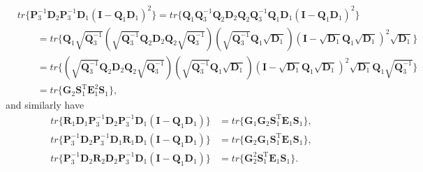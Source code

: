 \documentclass[12pt]{article}
\begin{document}
\begin{align}  \label{eq:dif4_F2_b}
& tr\{ \mathbf{P}_3^{-1} \mathbf{D}_2 \mathbf{P}_3^{-1} \mathbf{D}_1 (\mathbf{I} - \mathbf{Q}_1 \mathbf{D}_1)^2 \} = tr\{ \mathbf{Q}_1 \mathbf{Q}_3^{-1} \mathbf{Q}_2 \mathbf{D}_2 \mathbf{Q}_2 \mathbf{Q}_3^{-1} \mathbf{Q}_1 \mathbf{D}_1 (\mathbf{I} - \mathbf{Q}_1 \mathbf{D}_1)^2 \}  \nonumber \\
& \qquad = tr\{ \mathbf{Q}_1 \sqrt{\mathbf{Q}_3^{-1}} (\sqrt{\mathbf{Q}_3^{-1}} \mathbf{Q}_2 \mathbf{D}_2 \mathbf{Q}_2 \sqrt{\mathbf{Q}_3^{-1}}) (\sqrt{\mathbf{Q}_3^{-1}} \mathbf{Q}_1 \sqrt{\mathbf{D}_1}) (\mathbf{I} - \sqrt{\mathbf{D}_1} \mathbf{Q}_1 \sqrt{\mathbf{D}_1})^2 \sqrt{\mathbf{D}_1} \}  \nonumber \\
& \qquad = tr\{ (\sqrt{\mathbf{Q}_3^{-1}} \mathbf{Q}_2 \mathbf{D}_2 \mathbf{Q}_2 \sqrt{\mathbf{Q}_3^{-1}}) (\sqrt{\mathbf{Q}_3^{-1}} \mathbf{Q}_1 \sqrt{\mathbf{D}_1}) (\mathbf{I} - \sqrt{\mathbf{D}_1} \mathbf{Q}_1 \sqrt{\mathbf{D}_1})^2 \sqrt{\mathbf{D}_1} \mathbf{Q}_1 \sqrt{\mathbf{Q}_3^{-1}} \}  \nonumber \\
& \qquad = tr\{ \mathbf{G}_2 \mathbf{S}_1^{\mathrm{T}} \mathbf{E}_1^2 \mathbf{S}_1 \},
\end{align}
and similarly have
\begin{subequations} \label{eq:dif4_F2_c}
\begin{align}
tr\{ \mathbf{R}_1 \mathbf{D}_1 \mathbf{P}_3^{-1} \mathbf{D}_2 \mathbf{P}_3^{-1} \mathbf{D}_1 (\mathbf{I} - \mathbf{Q}_1 \mathbf{D}_1) \} &= tr\{ \mathbf{G}_1 \mathbf{G}_2 \mathbf{S}_1^{\mathrm{T}} \mathbf{E}_1 \mathbf{S}_1 \},\\
tr\{ \mathbf{P}_3^{-1} \mathbf{D}_2 \mathbf{P}_3^{-1} \mathbf{D}_1 \mathbf{R}_1 \mathbf{D}_1 (\mathbf{I} - \mathbf{Q}_1 \mathbf{D}_1) \} &= tr\{ \mathbf{G}_2 \mathbf{G}_1 \mathbf{S}_1^{\mathrm{T}} \mathbf{E}_1 \mathbf{S}_1 \},\\
tr\{ \mathbf{P}_3^{-1} \mathbf{D}_2 \mathbf{R}_2 \mathbf{D}_2 \mathbf{P}_3^{-1} \mathbf{D}_1 (\mathbf{I} - \mathbf{Q}_1 \mathbf{D}_1) \} &= tr\{ \mathbf{G}_2^2 \mathbf{S}_1^{\mathrm{T}} \mathbf{E}_1 \mathbf{S}_1 \}.
\end{align}
\end{subequations}
\end{document}
